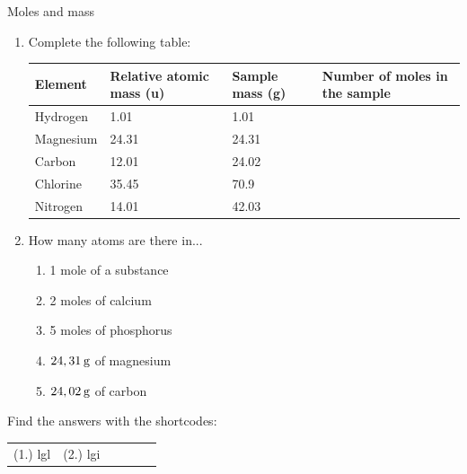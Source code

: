 	\par
\label{m38717*secfhsst!!!underscore!!!id127}
            \begin{exercises}{Moles and mass
      }
            \nopagebreak
      \label{m38717*id276067}\begin{enumerate}[noitemsep, label=\textbf{\arabic*}. ] 
            \label{m38717*uid2}\item 
Complete the following table:
          \begin{table}[H]
        \begin{center}
      \label{m38717*id276082}
    \noindent
      \begin{tabular}{|l|l|l|l|}\hline
\textbf{Element} & \textbf{Relative atomic mass (u)} & \textbf{Sample mass (g)} & \textbf{Number of moles in the sample} \\ \hline
        Hydrogen & 1.01 & 1.01 & \\ \hline
        Magnesium & 24.31 & 24.31 & \\ \hline
        Carbon & 12.01 & 24.02 & \\ \hline
        Chlorine & 35.45 & 70.9 & \\ \hline
        Nitrogen & 14.01 & 42.03 & \\ \hline
    \end{tabular}
      \end{center}
\end{table}
    \par
          \label{m38717*uid3}\item 
How many atoms are there in...
\label{m38717*id276311}\begin{enumerate}[noitemsep, label=\textbf{\alph*}. ] 
            \label{m38717*uid4}\item 1 mole of a substance
\label{m38717*uid5}\item 2 moles of calcium
\label{m38717*uid6}\item 5 moles of phosphorus
\label{m38717*uid7}\item $24,31\phantom{\rule{2pt}{0ex}}\text{g}$ of magnesium
\label{m38717*uid8}\item $24,02\phantom{\rule{2pt}{0ex}}\text{g}$ of carbon
\end{enumerate}
                \end{enumerate}
    \label{m38717*cid3}
\par {} Find the answers with the shortcodes:
 \par \begin{tabular}[h]{cccccc}
 (1.) lgl  &  (2.) lgi  & \end{tabular}
\end{exercises}
